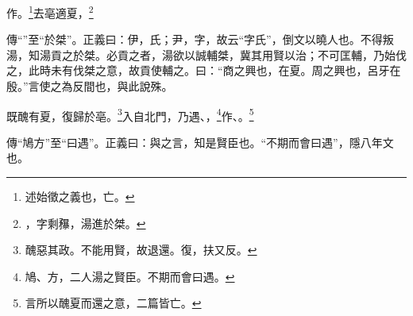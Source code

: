 作。\footnote{述始徵之義也，亡。}去亳適夏，\footnote{，字剩{\hanaa 䂍}，湯進於桀。}

{\noindent\zhuan{}\fzbyks 傳“”至“於桀”。正義曰：伊，氏；尹，字，故云“字氏”，倒文以曉人也。不得叛湯，知湯貢之於桀。必貢之者，湯欲以誠輔桀，冀其用賢以治；不可匡輔，乃始伐之，此時未有伐桀之意，故貢使輔之。曰：“商之興也，在夏。周之興也，呂牙在殷。”言使之為反間也，與此說殊。 \par}

既醜有夏，復歸於亳。\footnote{醜惡其政。不能用賢，故退還。復，扶又反。}入自北門，乃遇、，\footnote{鳩、方，二人湯之賢臣。不期而會曰遇。}作、。\footnote{言所以醜夏而還之意，二篇皆亡。}

{\noindent\zhuan{}\fzbyks 傳“鳩方”至“曰遇”。正義曰：與之言，知是賢臣也。“不期而會曰遇”，隱八年文也。 \par}

